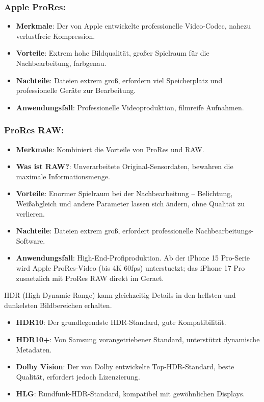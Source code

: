 \subsubsection*{Apple ProRes:}

\begin{itemize}
  \item \textbf{Merkmale}: Der von Apple entwickelte professionelle Video-Codec, nahezu verlustfreie Kompression.
  \item \textbf{Vorteile}: Extrem hohe Bildqualität, großer Spielraum für die Nachbearbeitung, farbgenau.
  \item \textbf{Nachteile}: Dateien extrem groß, erfordern viel Speicherplatz und professionelle Geräte zur Bearbeitung.
  \item \textbf{Anwendungsfall}: Professionelle Videoproduktion, filmreife Aufnahmen.
\end{itemize}

\subsubsection*{ProRes RAW:}

\begin{itemize}
  \item \textbf{Merkmale}: Kombiniert die Vorteile von ProRes und RAW.
  \item \textbf{Was ist RAW?}: Unverarbeitete Original-Sensordaten, bewahren die maximale Informationsmenge.
  \item \textbf{Vorteile}: Enormer Spielraum bei der Nachbearbeitung – Belichtung, Weißabgleich und andere Parameter lassen sich ändern, ohne Qualität zu verlieren.
  \item \textbf{Nachteile}: Dateien extrem groß, erfordert professionelle Nachbearbeitungs-Software.
  \item \textbf{Anwendungsfall}: High-End-Profiproduktion. Ab der iPhone 15 Pro-Serie wird Apple ProRes-Video (bis 4K 60fps) unterstuetzt; das iPhone 17 Pro zusaetzlich mit ProRes RAW direkt im Geraet.
\end{itemize}


HDR (High Dynamic Range) kann gleichzeitig Details in den hellsten und dunkelsten Bildbereichen erhalten.

\begin{itemize}
  \item \textbf{HDR10}: Der grundlegendste HDR-Standard, gute Kompatibilität.
  \item \textbf{HDR10+}: Von Samsung vorangetriebener Standard, unterstützt dynamische Metadaten.
  \item \textbf{Dolby Vision}: Der von Dolby entwickelte Top-HDR-Standard, beste Qualität, erfordert jedoch Lizenzierung.
  \item \textbf{HLG}: Rundfunk-HDR-Standard, kompatibel mit gewöhnlichen Displays.
\end{itemize}

